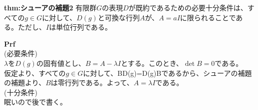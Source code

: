 \documentclass[a4paper,11pt]{jsarticle}
\begin{document}
\begin{itembox}[l]{\textbf{thm:シューアの補題2}}
    有限群$G$の表現$D$が既約であるための必要十分条件は、すべての$g \in G$に対して、$D(g)$と可換な行列$A$が、$A=a I$に限られることである。ただし、$I$は単位行列である。
\end{itembox}
\textbf{Prf}\\
(必要条件)\\
$\lambda$を$D(g)$の固有値とし、$B=A-\lambda I$とする。このとき、$\det B=0$である。\\
仮定より、すべての$g \in G$に対して、BD(g)=D(g)Bであるから、シューアの補題の補題より、$B$は零行列である。よって、$A=\lambda I$である。\\
(十分条件)\\
眠いので後で書く。\\
\end{document}
